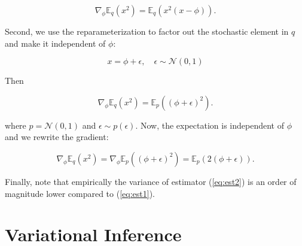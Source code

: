 \documentclass[11pt]{article}
\def\N{\mathcal{N}}
\def\E{\mathbb{E}}
\def\eps{\epsilon}
\begin{document}
\begin{equation}
\nabla_\phi\E_q(x^2) = \E_q(x^2(x-\phi)).
\label{eq:est1}
\end{equation}

Second, we use the reparameterization to factor out the stochastic element in $q$ and make it independent of $\phi$:

\begin{equation}
x=\phi + \eps,\quad \eps\sim\N(0,1)
\end{equation}

Then

\begin{equation}
\nabla_\phi\E_q(x^2) = \E_p((\phi+\eps)^2).
\end{equation}

where $p=\N(0,1)$ and $\eps\sim p(\eps)$. Now, the expectation is independent of $\phi$ and we rewrite the gradient:

\begin{equation}
\nabla_\phi\E_q(x^2) = \nabla_\phi \E_p((\phi+\eps)^2) = \E_p(2(\phi+\eps)).
\label{eq:est2}
\end{equation}

Finally, note that empirically the variance of estimator (\ref{eq:est2}) is an order of magnitude lower compared to (\ref{eq:est1}).

\section{Variational Inference}




 
\end{document}
